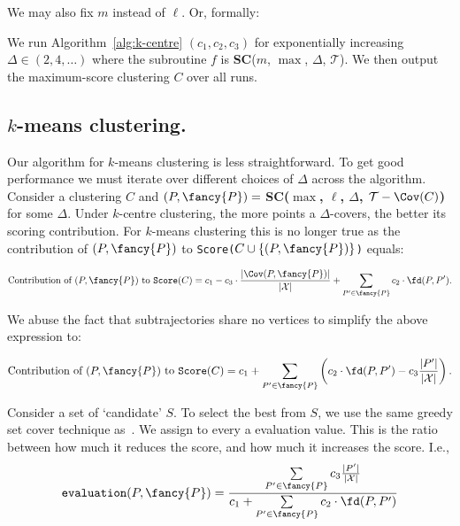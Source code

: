 \documentclass[english, thm-restate]{lipics-v2021}
\begin{document}
\noindent
We may also fix $m$ instead of $\ell$. Or, formally:

\begin{algodef}
\label{algodef:k-centre-size}
         We run Algorithm~\ref{alg:k-centre} $(c_1, c_2, c_3)$ for exponentially increasing $\Delta \in (2, 4, \ldots )$  where the subroutine $f$ is \textbf{SC}($m$, $\max$, $\Delta$, $\mathcal{T}$). We then output the maximum-score clustering $C$ over all runs.
\end{algodef}



\subsection{\texorpdfstring{$k$-means clustering.}{k-means clustering} }

Our algorithm for $k$-means clustering is less straightforward. 
To get good performance we must iterate over different choices of $\Delta$ across the algorithm. Consider a clustering $C$ and $(P, {\fancy{P}})=$ \textbf{SC($\max$, $\ell$, $\Delta$, $\mathcal{T} - \Cov(C)$)} for some $\Delta$. 
Under $k$-centre clustering, the more points a $\Delta$-\pathlet covers, the better its scoring contribution. 
For $k$-means clustering this is no longer true as the contribution of $(P, {\fancy{P}})$ to \texttt{Score($C \cup \{ (P, {\fancy{P}})\}$)} equals:

\[
\textnormal{Contribution of } (P, {\fancy{P}}) \textnormal{ to } \texttt{Score}(C) = c_1 - c_3 \cdot \frac{|\Cov(P, {\fancy{P}})|}{|\mathcal{X}|} + \sum_{P' \in {\fancy{P}}} c_2 \cdot \fd(P, P').
\]

\noindent

\noindent
We abuse the fact that subtrajectories share no vertices to simplify the above expression to:

\[
\textnormal{Contribution of } (P, {\fancy{P}}) \textnormal{ to } \texttt{Score}(C) =  
c_1 + \sum_{P' \in {\fancy{P}}} \left( c_2 \cdot \fd(P, P') - c_3  \frac{|P'|}{|\mathcal{X}|} \right).
\]


\noindent
Consider a set of `candidate' \pathlets $S$.
To select the best \pathlet from $S$, we use the same greedy set cover technique as~\cite{agarwal2018subtrajectory}. We assign to every \pathlet a evaluation value. This is the ratio between how much it reduces the score, and how much it increases the score. 
I.e.,
\[
\texttt{evaluation}(P, {\fancy{P}}) = \frac{\sum\limits_{P' \in {\fancy{P}}  } c_3 \frac{|P'|}{|\mathcal{X}| } }{c_1 + \sum\limits_{P' \in {\fancy{P}}} c_2 \cdot \fd(P, P')}
\]
\end{document}
